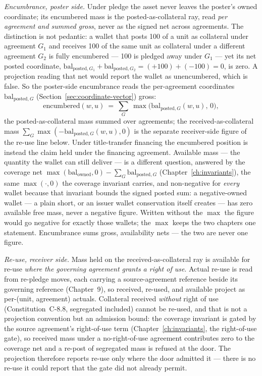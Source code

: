 \documentclass[11pt,a4paper]{article}
\begin{document}
\emph{Encumbrance, poster side.} Under pledge the asset never leaves the
poster's owned coordinate; its encumbered mass is the posted-as-collateral ray,
read \emph{per agreement and summed gross}, never as the signed net across
agreements. The distinction is not pedantic: a wallet that posts 100 of a unit as
collateral under agreement $G_1$ and receives 100 of the same unit as collateral
under a different agreement $G_2$ is fully encumbered --- 100 is pledged away under
$G_1$ --- yet its net posted coordinate,
$\mathrm{bal}_{\text{posted},G_1}+\mathrm{bal}_{\text{posted},G_2}=(+100)+(-100)=0$,
is zero. A projection reading that net would report the wallet as unencumbered,
which is false. So the poster-side encumbrance reads the per-agreement coordinates
$\mathrm{bal}_{\text{posted},G}$ (Section~\ref{sec:coordinate-vector})
gross:
\[
\text{encumbered}(w,u)\ =\ \sum_{G}\ \max\bigl(\mathrm{bal}_{\text{posted},G}(w,u),\,0\bigr),
\]
the posted-as-collateral mass summed over agreements; the received-as-collateral
mass $\sum_{G}\max(-\mathrm{bal}_{\text{posted},G}(w,u),0)$ is the separate
receiver-side figure of the re-use line below. Under title-transfer financing the
encumbered position is instead the claim held under the financing agreement.
Available mass --- the quantity the wallet can still deliver --- is a different
question, answered by the coverage net $\max(\mathrm{bal}_{\text{owned}},0)-\sum_G
\mathrm{bal}_{\text{posted},G}$ (Chapter~\ref{ch:invariants}), the same
$\max(\cdot,0)$ the coverage invariant carries, and non-negative for \emph{every}
wallet because that invariant bounds the signed posted sum: a negative-owned wallet ---
a plain short, or an issuer wallet conservation itself creates --- has zero available
free mass, never a negative figure. Written without the $\max$ the figure would go
negative for exactly those wallets; the $\max$ keeps the two chapters one statement.
Encumbrance sums gross, availability nets --- the two are never one figure.

\emph{Re-use, receiver side.} Mass held on the received-as-collateral ray is
available for re-use \emph{where the governing agreement grants a right of use}.
Actual re-use is read from re-pledge moves, each carrying a source-agreement reference
beside its governing reference (Chapter~9), so received, re-used, and available project as
per-(unit, agreement) actuals. Collateral received \emph{without} right of use
(Constitution~C-8.8, segregated included) cannot be re-used, and that is not a projection
convention but an admission bound: the coverage invariant is gated by the source
agreement's right-of-use term (Chapter~\ref{ch:invariants}, the right-of-use gate), so
received mass under a no-right-of-use agreement contributes zero to the coverage net and a
re-post of segregated mass is refused at the door. The projection therefore reports re-use
only where the door admitted it --- there is no re-use it could report that the gate did
not already permit.
\end{document}
